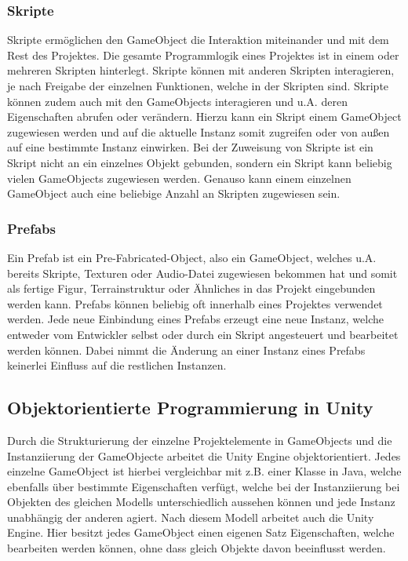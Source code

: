 \documentclass[
	12pt, %
	a4paper,
	listof=totoc, %
	bibliography=totoc, %
	numbers=noenddot, %
	ngerman, %
	headsepline, %
	oneside %
	]{scrbook} %
\begin{document}
\subsubsection{Skripte}
Skripte ermöglichen den GameObject die Interaktion miteinander und mit dem Rest des Projektes. Die gesamte Programmlogik eines Projektes ist in einem oder mehreren Skripten hinterlegt. Skripte können mit anderen Skripten interagieren, je nach Freigabe der einzelnen Funktionen, welche in der Skripten sind. Skripte können zudem auch mit den GameObjects interagieren und u.A. deren Eigenschaften abrufen oder verändern. Hierzu kann ein Skript einem GameObject zugewiesen werden und auf die aktuelle Instanz somit zugreifen oder von außen auf eine bestimmte Instanz einwirken. Bei der Zuweisung von Skripte ist ein Skript nicht an ein einzelnes Objekt gebunden, sondern ein Skript kann beliebig vielen GameObjects zugewiesen werden. Genauso kann einem einzelnen GameObject auch eine beliebige Anzahl an Skripten zugewiesen sein.

\subsubsection{Prefabs}
Ein Prefab ist ein Pre-Fabricated-Object, also ein GameObject, welches u.A. bereits Skripte, Texturen oder Audio-Datei zugewiesen bekommen hat und somit als fertige Figur, Terrainstruktur oder Ähnliches in das Projekt eingebunden werden kann. Prefabs können beliebig oft innerhalb eines Projektes verwendet werden. Jede neue Einbindung eines Prefabs erzeugt eine neue Instanz, welche entweder vom Entwickler selbst oder durch ein Skript angesteuert und bearbeitet werden können. Dabei nimmt die Änderung an einer Instanz eines Prefabs keinerlei Einfluss auf die restlichen Instanzen.

\subsection{Objektorientierte Programmierung in Unity}
Durch die Strukturierung der einzelne Projektelemente in GameObjects und die Instanziierung der GameObjecte arbeitet die Unity Engine objektorientiert. Jedes einzelne GameObject ist hierbei vergleichbar mit z.B. einer Klasse in Java, welche ebenfalls über bestimmte Eigenschaften verfügt, welche bei der Instanziierung bei Objekten des gleichen Modells unterschiedlich aussehen können und jede Instanz unabhängig der anderen agiert. Nach diesem Modell arbeitet auch die Unity Engine. Hier besitzt jedes GameObject einen eigenen Satz Eigenschaften, welche bearbeiten werden können, ohne dass gleich Objekte davon beeinflusst werden.
\end{document}
